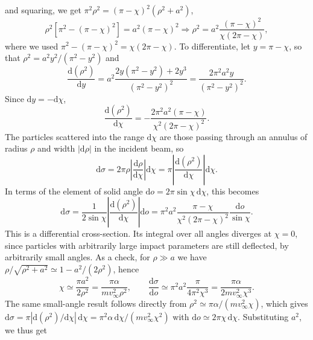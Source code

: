 \begin{problem}[title={Scattering in a repulsive \texorplain{$\alpha/r^2$}{α/r²} field}]
{\begin{equation*}
\end{equation*}
and squaring, we get $\pi^2\rho^2 = (\pi - \chi)^2(\rho^2 + a^2)$, \ie
\begin{equation*}
    \rho^2\left[ \pi^2 - (\pi - \chi)^2 \right] = a^2(\pi - \chi)^2 \Rightarrow \rho^2 = a^2\frac{(\pi - \chi)^2}{\chi(2\pi - \chi)},
\end{equation*}
where we used $\pi^2 - (\pi - \chi)^2 = \chi(2\pi - \chi)$. To differentiate, let $y = \pi - \chi$, so that $\rho^2 = a^2y^2/(\pi^2 - y^2)$ and
\begin{equation*}
    \frac{\mathrm{d}(\rho^2)}{\mathrm{d}y} = a^2\frac{2y(\pi^2 - y^2) + 2y^3}{(\pi^2 - y^2)^2} = \frac{2\pi^2a^2y}{(\pi^2 - y^2)^2}.
\end{equation*}
Since $\mathrm{d}y = -\mathrm{d}\chi$,
\begin{equation*}
    \frac{\mathrm{d}(\rho^2)}{\mathrm{d}\chi} = -\frac{2\pi^2a^2(\pi - \chi)}{\chi^2(2\pi - \chi)^2}.
\end{equation*}
The particles scattered into the range $\mathrm{d}\chi$ are those passing through an annulus of radius $\rho$ and width $|\mathrm{d}\rho|$ in the incident beam, so
\begin{equation*}
    \mathrm{d}\sigma = 2\pi\rho\left| \frac{\mathrm{d}\rho}{\mathrm{d}\chi} \right|\mathrm{d}\chi = \pi\left| \frac{\mathrm{d}(\rho^2)}{\mathrm{d}\chi} \right|\mathrm{d}\chi.
\end{equation*}
In terms of the element of solid angle $\mathrm{d}o = 2\pi\sin{\chi}\,\mathrm{d}\chi$, this becomes
\begin{equation*}
    \mathrm{d}\sigma = \frac{1}{2\sin{\chi}}\left| \frac{\mathrm{d}(\rho^2)}{\mathrm{d}\chi} \right|\mathrm{d}o = \pi^2a^2\frac{\pi - \chi}{\chi^2(2\pi - \chi)^2}\frac{\mathrm{d}o}{\sin{\chi}}.
\end{equation*}
This is a differential cross-section. Its integral over all angles diverges at $\chi = 0$, since particles with arbitrarily large impact parameters are still deflected, by arbitrarily small angles. As a check, for $\rho \gg a$ we have $\rho/\sqrt{\rho^2 + a^2} \simeq 1 - a^2/(2\rho^2)$, hence
\begin{equation*}
    \chi \simeq \frac{\pi a^2}{2\rho^2} = \frac{\pi\alpha}{mv_\infty^2\rho^2}, \qquad \frac{\mathrm{d}\sigma}{\mathrm{d}o} \simeq \pi^2a^2\frac{\pi}{4\pi^2\chi^3} = \frac{\pi\alpha}{2mv_\infty^2\chi^3}.
\end{equation*}
The same small-angle result follows directly from $\rho^2 \simeq \pi\alpha/(mv_\infty^2\chi)$, which gives $\mathrm{d}\sigma = \pi|\mathrm{d}(\rho^2)/\mathrm{d}\chi|\,\mathrm{d}\chi = \pi^2\alpha\,\mathrm{d}\chi/(mv_\infty^2\chi^2)$ with $\mathrm{d}o \simeq 2\pi\chi\,\mathrm{d}\chi$. Substituting $a^2$, we thus get
}
\end{problem}
